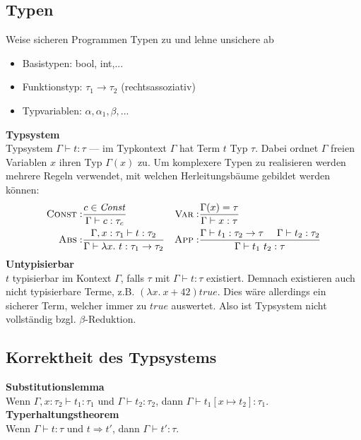 \subsection{Typen}
Weise sicheren Programmen Typen zu und lehne unsichere ab
\begin{itemize}
  \item Basistypen: bool, int,...
  \item Funktionstyp: \(\tau_1 \rightarrow \tau_2\) (rechtsassoziativ)
  \item Typvariablen: \(\alpha, \alpha_1, \beta,...\)
\end{itemize}
\textbf{Typsystem}\\
Typsystem \(\Gamma \vdash t: \tau\) --- im Typkontext \(\Gamma\) hat Term \(t\) Typ \(\tau\). Dabei ordnet \(\Gamma\)
freien Variablen \(x\) ihren Typ \(\Gamma(x)\) zu.
Um komplexere Typen zu realisieren werden mehrere Regeln verwendet, mit welchen Herleitungsbäume gebildet werden können:\\
\begin{align*}
  \textsc{Const}:& \frac{c \in \mathit{Const}}{\Gamma \vdash c: \tau_c} &
  \textsc{Var}:&   \frac{\Gamma(x) = \tau}{\Gamma \vdash x: \tau}\\
  \textsc{Abs}:&   \frac{\Gamma, x: \tau_1 \vdash t: \tau_2}{\Gamma \vdash \lambda x.\ t: \tau_1 \rightarrow \tau_2} &
  \textsc{App}:&   \frac{\Gamma \vdash t_1: \tau_2 \rightarrow \tau \ \ \ \ \Gamma \vdash t_2: \tau_2}{\Gamma \vdash t_1\ t_2: \tau}                                                                                                                      
\end{align*}
\textbf{Untypisierbar}\\
\(t\) typisierbar im Kontext \(\Gamma\), falls \(\tau\) mit \(\Gamma \vdash t: \tau\) existiert.
Demnach existieren auch nicht typisierbare Terme, z.B. \((\lambda x.\ x + 42) \mathit{true}\).
Dies wäre allerdings ein sicherer Term, welcher immer zu \(\mathit{true}\) auswertet. Also ist Typsystem nicht vollständig
bzgl. \(\beta\)-Reduktion.

\subsection{Korrektheit des Typsystems}
\textbf{Substitutionslemma}\\
Wenn \(\Gamma, x: \tau_2 \vdash t_1: \tau_1\) und \(\Gamma \vdash t_2: \tau_2\), dann \(\Gamma \vdash t_1[x \mapsto t_2]: \tau_1\).\\
\textbf{Typerhaltungstheorem}\\
Wenn \(\Gamma \vdash t: \tau\) und \(t \Rightarrow t'\), dann \(\Gamma \vdash t': \tau\).

